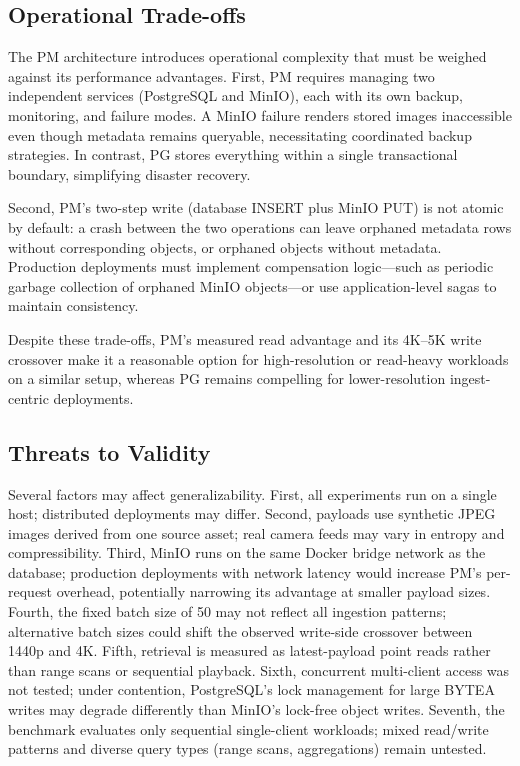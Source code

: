 \documentclass[conference, a4paper]{IEEEtran}
\begin{document}
\subsection{Operational Trade-offs}
The PM architecture introduces operational complexity that must be weighed against its performance advantages. First, PM requires managing two independent services (PostgreSQL and MinIO), each with its own backup, monitoring, and failure modes. A MinIO failure renders stored images inaccessible even though metadata remains queryable, necessitating coordinated backup strategies. In contrast, PG stores everything within a single transactional boundary, simplifying disaster recovery.

Second, PM's two-step write (database INSERT plus MinIO PUT) is not atomic by default: a crash between the two operations can leave orphaned metadata rows without corresponding objects, or orphaned objects without metadata. Production deployments must implement compensation logic---such as periodic garbage collection of orphaned MinIO objects---or use application-level sagas to maintain consistency.

Despite these trade-offs, PM's measured read advantage and its 4K--5K write crossover make it a reasonable option for high-resolution or read-heavy workloads on a similar setup, whereas PG remains compelling for lower-resolution ingest-centric deployments.

\subsection{Threats to Validity}
Several factors may affect generalizability. First, all experiments run on a single host; distributed deployments may differ. Second, payloads use synthetic JPEG images derived from one source asset; real camera feeds may vary in entropy and compressibility. Third, MinIO runs on the same Docker bridge network as the database; production deployments with network latency would increase PM's per-request overhead, potentially narrowing its advantage at smaller payload sizes. Fourth, the fixed batch size of 50 may not reflect all ingestion patterns; alternative batch sizes could shift the observed write-side crossover between 1440p and 4K. Fifth, retrieval is measured as latest-payload point reads rather than range scans or sequential playback. Sixth, concurrent multi-client access was not tested; under contention, PostgreSQL's lock management for large BYTEA writes may degrade differently than MinIO's lock-free object writes. Seventh, the benchmark evaluates only sequential single-client workloads; mixed read/write patterns and diverse query types (range scans, aggregations) remain untested.
\end{document}

